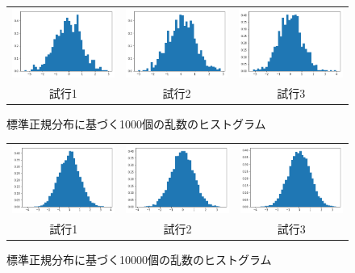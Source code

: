 \begin{figure}[h]
  \begin{center}
    \begin{tabular}{ccc}
      \includegraphics[width=0.32\hsize]{figure/1000_1.png} &
      \includegraphics[width=0.32\hsize]{figure/1000_2.png} &
      \includegraphics[width=0.32\hsize]{figure/1000_3.png} \\
      試行1 & 試行2 &試行3
    \end{tabular}
    \caption{標準正規分布に基づく1000個の乱数のヒストグラム}
    \label{figure1}
  \end{center}
\end{figure}
\begin{figure}[h]
  \begin{center}
    \begin{tabular}{ccc}
      \includegraphics[width=0.32\hsize]{figure/10000_1.png} &
      \includegraphics[width=0.32\hsize]{figure/10000_2.png} &
      \includegraphics[width=0.32\hsize]{figure/10000_3.png} \\
      試行1 & 試行2 &試行3
    \end{tabular}
    \caption{標準正規分布に基づく10000個の乱数のヒストグラム}
    \label{figure1}
  \end{center}
\end{figure}
